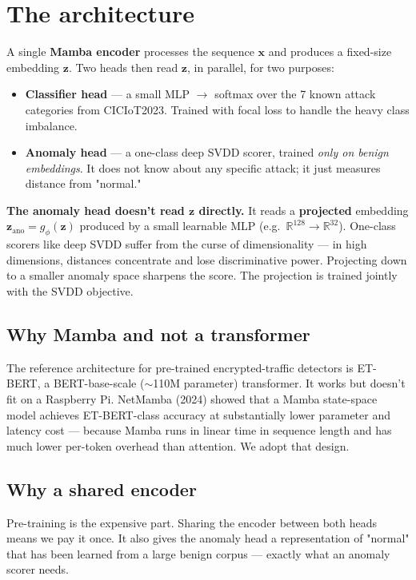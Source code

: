 \documentclass[11pt,a4paper]{article}
\begin{document}
\section{The architecture}

A single \textbf{Mamba encoder} processes the sequence $\mathbf{x}$ and produces a fixed-size embedding $\mathbf{z}$. Two heads then read $\mathbf{z}$, in parallel, for two purposes:

\begin{itemize}[leftmargin=*, itemsep=2pt]
  \item \textbf{Classifier head} --- a small MLP $\to$ softmax over the 7 known attack categories from CICIoT2023. Trained with focal loss to handle the heavy class imbalance.
  \item \textbf{Anomaly head} --- a one-class deep SVDD scorer, trained \emph{only on benign embeddings}. It does not know about any specific attack; it just measures distance from "normal."
\end{itemize}

\begin{tcolorbox}[idea]
\textbf{The anomaly head doesn't read $\mathbf{z}$ directly.} It reads a \textbf{projected} embedding $\mathbf{z}_\text{ano} = g_\phi(\mathbf{z})$ produced by a small learnable MLP (e.g.\ $\mathbb{R}^{128} \to \mathbb{R}^{32}$). One-class scorers like deep SVDD suffer from the curse of dimensionality --- in high dimensions, distances concentrate and lose discriminative power. Projecting down to a smaller anomaly space sharpens the score. The projection is trained jointly with the SVDD objective.
\end{tcolorbox}

\subsection{Why Mamba and not a transformer}
The reference architecture for pre-trained encrypted-traffic detectors is ET-BERT, a BERT-base-scale ($\sim$110M parameter) transformer. It works but doesn't fit on a Raspberry Pi. NetMamba (2024) showed that a Mamba state-space model achieves ET-BERT-class accuracy at substantially lower parameter and latency cost --- because Mamba runs in linear time in sequence length and has much lower per-token overhead than attention. We adopt that design.

\subsection{Why a shared encoder}
Pre-training is the expensive part. Sharing the encoder between both heads means we pay it once. It also gives the anomaly head a representation of "normal" that has been learned from a large benign corpus --- exactly what an anomaly scorer needs.
\end{document}
